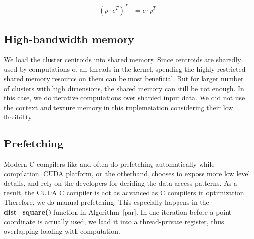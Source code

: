 \begin{align*}
  (p \cdot c^T)^T &= c \cdot p^T
\end{align*}

\subsection{High-bandwidth memory}

We load the cluster centroids into shared memory. Since centroids are sharedly 
used by computations of all threads in the kernel, spending the highly restricted
shared memory resource on them can be most beneficial. 
But for larger number of clusters with high dimensions, the shared memory
can still be not enough. In this case,
we do iterative computations over sharded input data.
We did not use the context and texture memory in this 
implemetation considering their low flexibility.

\subsection{Prefetching}

Modern C compilers like \gcc and \clang often do prefetching automatically while
compilation. CUDA platform, on the otherhand, chooses to expose more low level 
details, and rely on the developers for deciding the data access patterns. As a 
result, the CUDA C compiler is not as advanced as C compilers in optimization.
Therefore, we do manual prefetching.
This especially happens in the \textbf{dist\_square()} function in 
Algorithm~\ref{par}. In one iteration before a point coordinate is actually used, 
we load it into a thread-private register, thus overlapping loading with 
computation.

